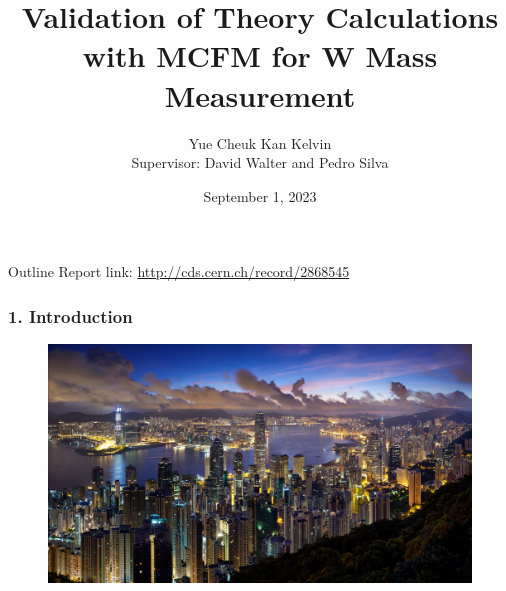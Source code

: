 \documentclass{beamer}
\title{Validation of Theory Calculations with MCFM for W Mass Measurement}
\author[Yue Cheuk Kan Kelvin]
{Yue Cheuk Kan Kelvin\\[5mm]{Supervisor: David Walter and Pedro Silva}}
\date{September 1, 2023}
\begin{document}
\frame{\titlepage}

\begin{frame}{Outline}
    \tableofcontents
Report link: \href{http://cds.cern.ch/record/2868545}{http://cds.cern.ch/record/2868545}
\end{frame}

\begin{frame}
\frametitle{1. Introduction}
\begin{figure}[H]
\centering
\includegraphics[width=.9\linewidth]{HK night view}
\end{figure}
\end{frame}
\end{document}
